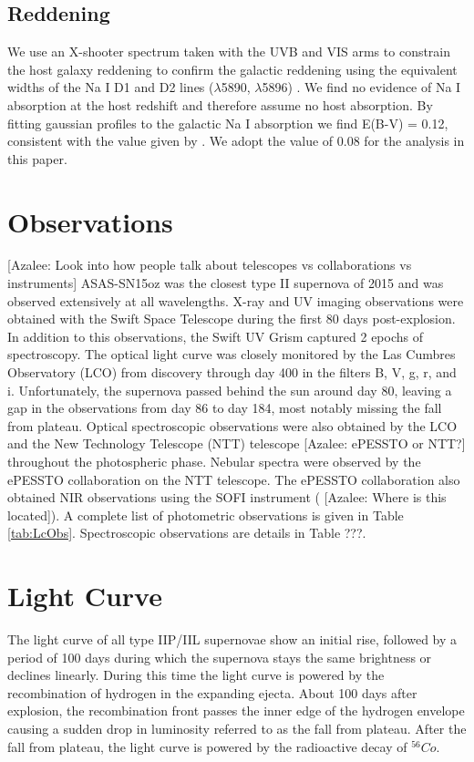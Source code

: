 \documentclass[preprint]{aastex61}
\newcommand{\azaleecomment}[1]{{\color{red} [{#1}]}}
\newcommand{\Azalee}[1]{\azaleecomment{Azalee: #1}}
\begin{document}
\subsection{Reddening}
We use an X-shooter spectrum taken with the UVB and VIS arms to constrain the host galaxy reddening to confirm the galactic reddening using the equivalent widths of the Na I D1 and D2 lines ($\lambda$5890, $\lambda$5896) \citep{2012poznanski}. 
We find no evidence of Na I absorption at the host redshift and therefore assume no host absorption. 
By fitting gaussian profiles to the galactic Na I absorption we find E(B-V) = 0.12, consistent with the value given by \citet{2011schlafly}. 
We adopt the \citet{2011schlafly}  value of 0.08 for the analysis in this paper. 

\section{Observations}
\Azalee{Look into how people talk about telescopes vs collaborations vs instruments}
ASAS-SN15oz was the closest type II supernova of 2015 and was observed extensively at all wavelengths. X-ray and UV imaging observations were obtained with the Swift Space Telescope during the first 80 days post-explosion.
In addition to this observations, the Swift UV Grism captured 2 epochs of spectroscopy. 
The optical light curve was closely monitored by the Las Cumbres Observatory (LCO) from discovery through day 400 in the filters B, V, g, r, and i. 
Unfortunately, the supernova passed behind the sun around day 80, leaving a gap in the observations from day 86 to day 184, most notably missing the fall from plateau.
Optical spectroscopic observations were also obtained by the LCO and the New Technology Telescope (NTT) telescope \Azalee{ePESSTO or NTT?} throughout the photospheric phase. 
Nebular spectra were observed by the ePESSTO collaboration on the NTT telescope. 
The ePESSTO collaboration also obtained NIR observations using the SOFI instrument (\Azalee{Where is this located}).
A complete list of photometric observations is given in Table \ref{tab:LcObs}. 
Spectroscopic observations are details in Table ???.

\section{Light Curve} \label{LC}
The light curve of all type IIP/IIL supernovae show an initial rise, followed by a period of 100 days during which the supernova stays the same brightness or declines linearly. 
During this time the light curve is powered by the recombination of hydrogen in the expanding ejecta. 
About 100 days after explosion, the recombination front passes the inner edge of the hydrogen envelope causing a sudden drop in luminosity referred to as the fall from plateau.  
After the fall from plateau, the light curve is powered by the radioactive decay of ${}^{56}Co$.
\end{document}
